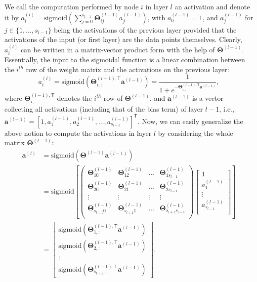 We call the computation performed by node $i$ in layer $l$ an activation and denote it by $a_{i}^{(l)}= \text{sigmoid}\left(\sum_{j=0}^{s_{l-1}}\bm{\Theta}^{(l-1)}_{ij}a_{j}^{(l-1)}\right)$, with $a_{0}^{(l-1)} = 1$, and $a_{j}^{(l-1)}$ for $j \in \{1,\dots, s_{l-1}\}$ being the activations of the previous layer provided that the activations of the input (or first layer) are the data points themselves. Clearly, $a_{i}^{(l)}$ can be written in a matrix-vector product form with the help of $\bm{\Theta}^{(l-1)}$. Essentially, the input to the sigmoidal function is a linear combination between the $i^{th}$ row of the weight matrix and the activations on the previous layer: 
\begin{equation*}
a_{i}^{(l)} = \text{sigmoid}\left(\bm{\Theta}^{(l-1), \mathsf{T}}_{i,:} \bm{a}^{(l-1)}\right) = \frac{1}{1+ e^{-\bm{\Theta}^{(l-1), \mathsf{T}}_{i,:} \bm{a}^{(l-1)}}},
\end{equation*}
where $\bm{\Theta}^{(l-1), \mathsf{T}}_{i,:}$ denotes the $i^{th}$ row of $\bm{\Theta}^{(l-1)}$, and $\bm{a}^{(l-1)}$ is a vector collecting all activations (including that of the bias term) of layer $l-1$, i.e., $\bm{a}^{(l-1)} = \left[1, a_{1}^{(l-1)}, a_{2}^{(l-1)}, \dots, a_{s_{l-1}}^{(l-1)}\right]^{\mathsf{T}}$. Now, we can easily generalize the above notion to compute the activations in layer $l$  by considering the whole matrix $\bm{\Theta}^{(l-1)}$: 
\begin{align*}
\bm{a}^{(l)} & = \text{sigmoid} \left(\bm{\Theta}^{(l-1)}\bm{a}^{(l-1)}\right) \\
& = \text{sigmoid} \left[\left(\begin{array}{cccc}
\bm{\Theta}_{10}^{(l-1)} & \bm{\Theta}_{12}^{(l-1)} & \dots & \bm{\Theta}_{1s_{l-1}}^{(l-1)} \\
\bm{\Theta}_{20}^{(l-1)} & \bm{\Theta}_{21}^{(l-1)} & \dots & \bm{\Theta}_{2s_{l-1}}^{(l-1)} \\ 
\vdots & \vdots & \vdots & \vdots \\
\bm{\Theta}_{s_{l+1}0}^{(l-1)} & \bm{\Theta}_{s_{l+1}1}^{(l-1)} & \dots & \bm{\Theta}_{s_{l+1}s_{l-1}}^{(l-1)} \\ 
\end{array}
\right)\left[\begin{array}{c}
1 \\
a_{1}^{(l-1)} \\
\vdots \\
a_{s_{l-1}}^{(l-1)} \\
\end{array}
\right]\right] \\
& = \left[\begin{array}{c}
\text{sigmoid}\left(\bm{\Theta}^{(l-1), \mathsf{T}}_{1,:} \bm{a}^{(l-1)}\right)
 \\
 \text{sigmoid}\left(\bm{\Theta}^{(l-1), \mathsf{T}}_{2,:} \bm{a}^{(l-1)}\right) \\
 \vdots \\
 \text{sigmoid}\left(\bm{\Theta}^{(l-1), \mathsf{T}}_{s_{l+1},:} \bm{a}^{(l-1)}\right) 
\end{array} 
\right].
\end{align*}


